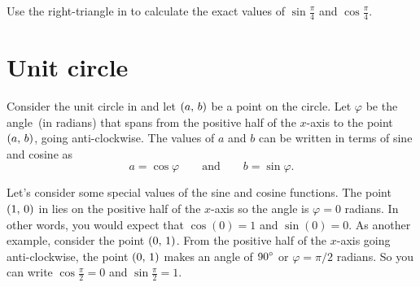 \documentclass[a4paper,oneside,12pt]{article}
\begin{document}
\begin{exercise}
Use the right-triangle in  to
calculate the exact values of $\sin\frac{\pi}{4}$ and
$\cos\frac{\pi}{4}$.
\end{exercise}



\section{Unit circle}

Consider the unit circle in  and let
$\left\lparen{a},\, {b}\right\rparen$ be a point on the circle.  Let $\varphi$ be the
angle~(in radians) that spans from the positive half of the $x$-axis
to the point $\left\lparen{a},\, {b}\right\rparen$, going anti-clockwise.  The values of $a$
and $b$ can be written in terms of sine and cosine as
\begin{equation}
\label{eqn:value_of_x_y_on_unit_circle}
a = \cos\varphi
\qquad\text{and}\qquad
b = \sin\varphi.
\end{equation}

Let's consider some special values of the sine and cosine functions.
The point $\left\lparen{1},\, {0}\right\rparen$ in  lies on
the positive half of the $x$-axis so the angle is $\varphi = 0$
radians.  In other words, you would expect that $\cos(0) = 1$ and
$\sin(0) = 0$.  As another example, consider the point $\left\lparen{0},\, {1}\right\rparen$.
From the positive half of the $x$-axis going anti-clockwise, the point
$\left\lparen{0},\, {1}\right\rparen$ makes an angle of ${90}^{\circ}$ or $\varphi = \pi / 2$
radians.  So you can write $\cos\frac{\pi}{2} = 0$ and
$\sin\frac{\pi}{2} = 1$.
\end{document}
